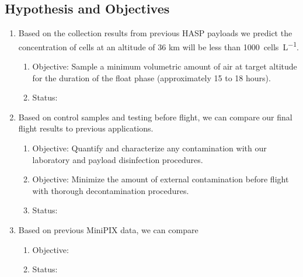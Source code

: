 \subsection{Hypothesis and Objectives}
\label{subsec:Hypothesis and Objectives}
\begin{enumerate}
	\item Based on the collection results from previous HASP payloads we predict the concentration of cells at an altitude of 36 km will be less than \SI{1000}{cells\per\liter}.
		\begin{enumerate}
			\item Objective: Sample a minimum volumetric amount of air at target altitude for the duration of the float phase (approximately 15 to 18 hours).
			\item Status:
		\end{enumerate}
%
	\item Based on control samples and testing before flight, we can compare our final flight results to previous applications.
		\begin{enumerate}
			\item Objective: Quantify and characterize any contamination with our laboratory and payload disinfection procedures.
			\item Objective: Minimize the amount of external contamination before flight with thorough decontamination procedures.
			\item Status:
		\end{enumerate}
%
	\item Based on previous MiniPIX data, we can compare
		\begin{enumerate}
			\item Objective:
			\item Status:
		\end{enumerate}	
\end{enumerate}